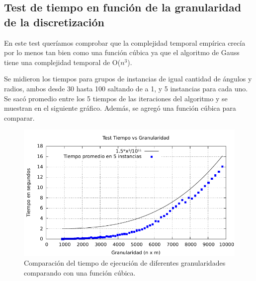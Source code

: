 \subsection{Test de tiempo en función de la granularidad de la discretización}
En este test queríamos comprobar que la complejidad temporal empírica crecía por lo menos tan bien
como una función cúbica ya que el algoritmo de Gauss tiene una complejidad temporal de O($n^3$).

Se midieron los tiempos para grupos de instancias de igual cantidad de ángulos y radios, ambos desde
30 hasta 100 saltando de a 1, y 5 instancias para cada uno. Se sacó promedio entre los 5 tiempos de
las iteraciones del algoritmo y se muestran en el siguiente gráfico. Además, se agregó una función
cúbica para comparar.


\begin{figure}[H]{}
\centering
\includegraphics{graphs/granuVstiempo2.pdf}
\caption{Comparación del tiempo de ejecución de diferentes granularidades comparando con una función cúbica.}
\label{gaussVsLU1}
\end{figure}

